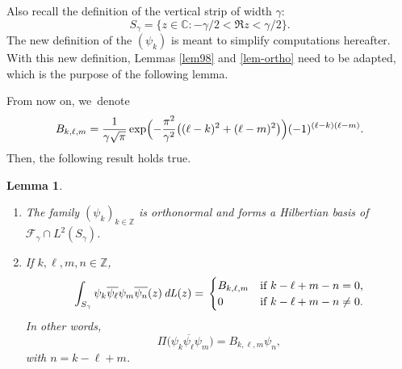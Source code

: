 \documentclass[10pt]{amsart}
\let\sep:
\DeclareMathOperator{\dL}{\mathit{dL}}
\newtheorem{lemme}[theorem]{Lemma}
\theoremstyle{definition}
\let\EE\exp
\let\ov\overline
\newcommand\Z{\mathbb Z}
\providecommand{\skpt}{\par\smallskip\noindent}
\begin{document}
Also recall the definition of the vertical strip of width $\gamma$:
\[
S_{\gamma} = \bigl\{z \in \mathbb{C}\sep -{\gamma}/{2} < \Re z <{\gamma}/{2} \bigr\}.
\]
The new definition of the $(\psi_k)$ is meant to simplify computations hereafter. With this new definition, Lemmas \ref{lem98} and \ref{lem-ortho} need to be adapted, which is the purpose of the following lemma.

From now on, we~denote
\begin{equation}\label{def-B}
B_{k,\ell,m} = \frac{1}{\gamma\sqrt{\pi}}\EE\Bigl(-\frac{\pi^2}{\gamma^2}\bigl((\ell-k)^2+(\ell-m)^2\bigr)\Bigr)(-1)^{(\ell-k)(\ell-m)}.
\end{equation}
Then, the following result holds true.

\skpt
\begin{lemme}\label{lem-ortho-hexa}
\begin{enumerate}
\item\label{lem-ortho-hexai} The family $(\psi_k)_{k \in \Z}$ is orthonormal and forms a Hilbertian basis of $\mathcal{F}_{\gamma} \cap L^{2}(S_{ \gamma})$.
\item\label{lem-ortho-hexaii} If $k,\ell,m, n \in \mathbb{Z}$,
\begin{equation*}
\int_{S_{\gamma}} \psi_{k}\ov{\psi_{\ell}} \psi_{m}\ov{\psi_{n}}(z) \dL(z) =\\
\begin{cases}
B_{k,\ell,m} & \text{if $k - \ell + m - n = 0$,} \\
0 & \text{if $k - \ell + m - n \neq 0$}.
\end{cases}
\end{equation*}
In other words,
\begin{equation}\label{proj4}
\Pi\bigl(\psi_{k}\ov{\psi_{\ell}} \psi_{m}\bigr)=B_{k,\ell,m} \psi_{n},
\end{equation}
with $n = k - \ell + m$.
\end{enumerate}
\end{lemme}
\end{document}
